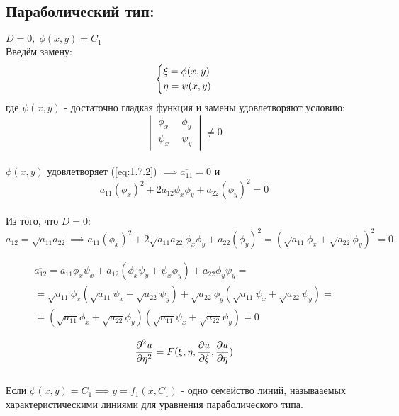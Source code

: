 \documentclass[../main.tex]{subfiles}
\begin{document}
\subsection*{Параболический тип: }
$D = 0, \; \phi(x, y) = C_1$
\\
Введём замену:
$$\begin{dcases}\xi = \phi(x,y) \\ \eta = \psi(x,y) \end{dcases}$$
где $\psi(x,y)$ - достаточно гладкая функция и замены удовлетворяют условию:
$$\begin{vmatrix}
		\phi_x \  & \ \phi_y
		\\
		\psi_x \  & \ \psi_y
	\end{vmatrix} \ne 0
$$ \\
$\phi(x,y)$ удовлетворяет (\ref{eq:1.7.2}) $\implies \overline{a_{11}}=0$ и \\
\begin{equation}
	a_{11}(\phi_x)^2 + 2a_{12}\phi_x\phi_y + a_{22}(\phi_y)^2=0
\end{equation}
\\
Из того, что $D=0$:
\begin{equation}\label{eq:1.7.4}
	a_{12}=\sqrt{a_{11}a_{22}} \implies 
	a_{11}(\phi_x)^2 + 2\sqrt{a_{11}a_{22}}\phi_x\phi_y + a_{22}(\phi_y)^2 =
	(\sqrt{a_{11}}\phi_x + \sqrt{a_{22}}\phi_y)^2=0
\end{equation}

\begin{gather*}
\overline{a_{12}}=a_{11}\phi_x\psi_x + a_{12}(\phi_x\psi_y + \psi_x\phi_y)+a_{22}\phi_y\psi_y = \\
 = \sqrt{a_{11}}\phi_x(\sqrt{a_{11}}\psi_x + \sqrt{a_{22}}\psi_y) + \sqrt{a_{22}}\phi_y(\sqrt{a_{11}}\psi_x + \sqrt{a_{22}}\psi_y)= \\
 = (\sqrt{a_{11}}\phi_x + \sqrt{a_{22}}\phi_y)(\sqrt{a_{11}}\psi_x + \sqrt{a_{22}}\psi_y) = 0
\end{gather*}

$$\frac{\partial^2u}{\partial\eta^2} = F(\xi, \eta, \frac{\partial u}{\partial \xi}, \frac{\partial u}{\partial \eta})$$\\
Если $\phi(x,y)=C_1 \implies y = f_1(x, C_1)$ - одно семейство линий, называаемых характеристическими линиями для уравнения параболического типа.\\
\end{document}
